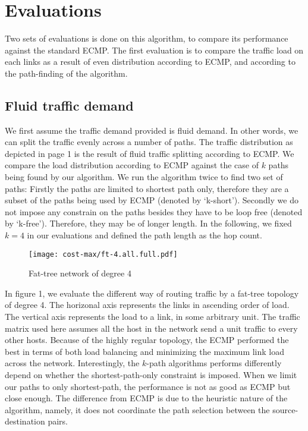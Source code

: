 \documentclass[conference]{IEEEtran}
\begin{document}
\section{Evaluations}\label{sec:eval}

Two sets of evaluations is done on this algorithm, to compare its performance
against the standard ECMP. The first evaluation is to compare the traffic load
on each links as a result of even distribution according to ECMP, and according
to the path-finding of the algorithm.

\subsection{Fluid traffic demand}

We first assume the traffic demand provided is fluid demand. In other words, we
can split the traffic evenly across a number of paths. The traffic distribution
as depicted in page 1 is the result of fluid traffic splitting according to
ECMP. We compare the load distribution according to ECMP against the case of
$k$ paths being found by our algorithm. We run the algorithm twice to find two
set of paths: Firstly the paths are limited to shortest path only, therefore
they are a subset of the paths being used by ECMP (denoted by `k-short').
Secondly we do not impose any constrain on the paths besides they have to be
loop free (denoted by `k-free'). Therefore, they may be of longer length. In
the following, we fixed $k=4$ in our evaluations and defined the path length as
the hop count.

\begin{figure}
\centering\texttt{[image: cost-max/ft-4.all.full.pdf]}
\caption{Fat-tree network of degree 4}
\end{figure}

In figure 1, we evaluate the different way of routing traffic by a fat-tree
topology of degree 4. The horizonal axis represents the links in ascending
order of load. The vertical axis represents the load to a link, in some
arbitrary unit. The traffic matrix used here assumes all the host in the
network send a unit traffic to every other hosts. Because of the highly regular
topology, the ECMP performed the best in terms of both load balancing and
minimizing the maximum link load across the network. Interestingly, the
$k$-path algorithms performs differently depend on whether the
shortest-path-only constraint is imposed. When we limit our paths to only
shortest-path, the performance is not as good as ECMP but close enough. The
difference from ECMP is due to the heuristic nature of the algorithm, namely,
it does not coordinate the path selection between the source-destination pairs.
\end{document}
